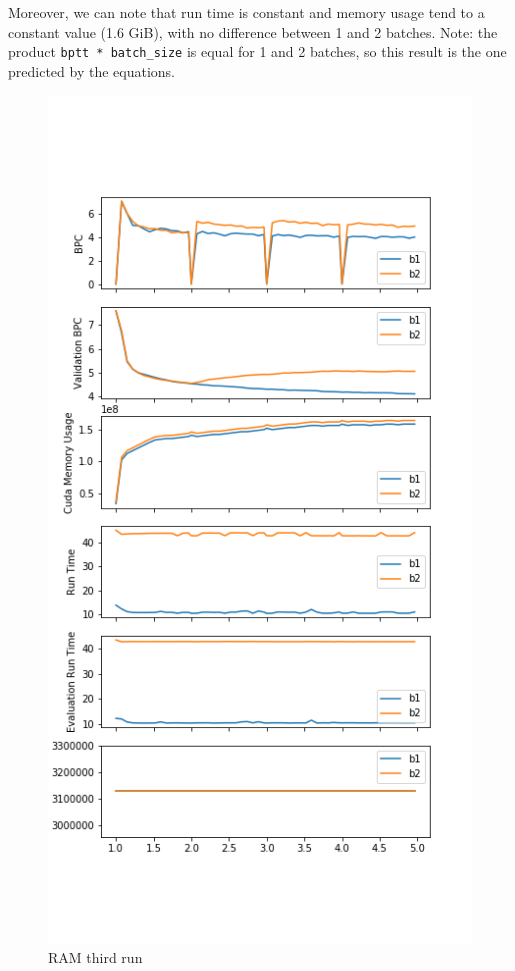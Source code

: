 Moreover, we can note that run time is constant and memory usage tend to
a constant value (1.6 GiB), with no difference between 1 and 2 batches.
Note: the product \lstinline!bptt * batch_size! is equal for 1 and 2
batches, so this result is the one predicted by the equations.

\begin{figure}[H]
\centering
\includegraphics[height=.85\textheight]{parts/appendix/reports-gmsnn/docs_esteban-latex/test_reports/2018-06-13/batch_1_2_frac.png}
\caption{RAM third run}
\end{figure}

